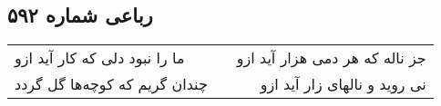 \begin{center}
\section*{رباعی شماره ۵۹۲}
\label{sec:sh592}
\begin{longtable}{l p{0.5cm} r}
ما را نبود دلی که کار آید ازو
&&
جز ناله که هر دمی هزار آید ازو
\\
چندان گریم که کوچه‌ها گل گردد
&&
نی روید و نالهای زار آید ازو
\\
\end{longtable}
\end{center}
